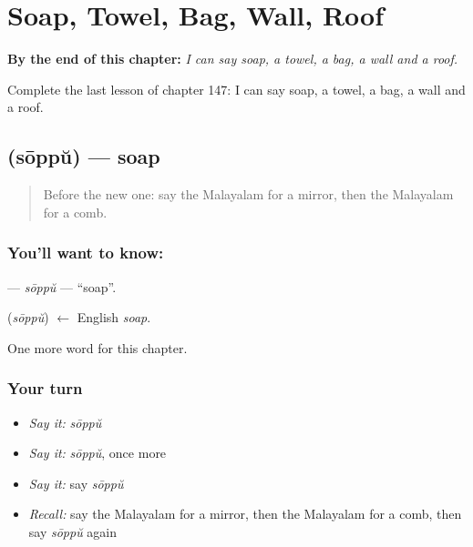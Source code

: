 
\chapter{Soap, Towel, Bag, Wall, Roof}
\label{ch:ml-soap-towel-bag-wall-roof}

\begin{chapteropening}
\textbf{By the end of this chapter:} \emph{I can say soap, a towel, a bag, a wall and a roof.}

Complete the last lesson of chapter 147: I can say soap, a towel, a bag, a wall and a roof.
\end{chapteropening}

\section[\texorpdfstring{\ml{സോപ്പ്} (sōppŭ)}{സോപ്പ് (sōppŭ)}]{ (sōppŭ) — soap}

\label{lesson:ML-C147-soppu}



\begin{quote}
Before the new one: say the Malayalam for a mirror, then the Malayalam for a comb.
\end{quote}

\subsection*{You'll want to know: }
\textbf{} — \emph{sōppŭ} — \textquotedblleft{}soap\textquotedblright{}.

\begin{cousinweb}
\textbf{} (\emph{sōppŭ}) $\leftarrow$ English \emph{soap}.
\end{cousinweb}

\begin{grammarlens}[title={What you've built}]
One more word for this chapter.
\end{grammarlens}

\subsection*{Your turn}
\begin{itemize}
\raggedright
  \item \emph{Say it:} \emph{sōppŭ}
  \item \emph{Say it:} \emph{sōppŭ}, once more
  \item \emph{Say it:} say \emph{sōppŭ}
  \item \emph{Recall:} say the Malayalam for a mirror, then the Malayalam for a comb, then say \emph{sōppŭ} again
\end{itemize}

